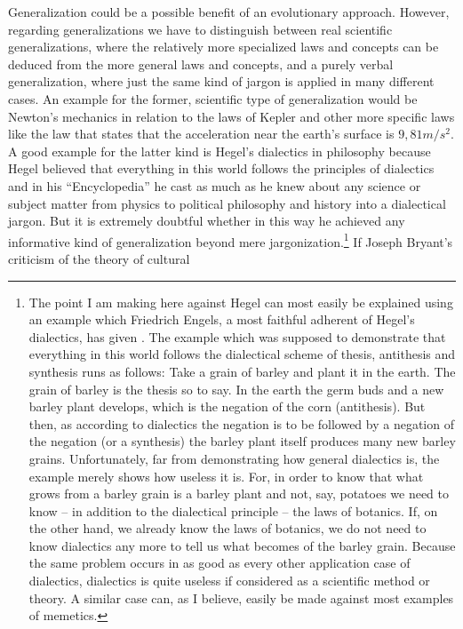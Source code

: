 Generalization could be a possible benefit of an evolutionary
approach.  However, regarding generalizations we have to distinguish
between real scientific generalizations, where the relatively more
specialized laws and concepts can be deduced from the more general
laws and concepts, and a purely verbal generalization, where just the
same kind of jargon is applied in many different cases. An example for
the former, scientific type of generalization would be Newton's
mechanics in relation to the laws of Kepler and other more specific
laws like the law that states that the acceleration near the earth's
surface is $9,81 m/s^2$. A good example for the latter kind is Hegel's
dialectics in philosophy because Hegel believed that everything in
this world follows the principles of dialectics and in his
``Encyclopedia'' he cast as much as he knew about any science or
subject matter from physics to political philosophy and history into a
dialectical jargon. But it is extremely doubtful whether in this way
he achieved any informative kind of generalization beyond mere
jargonization.\footnote{The point I am making here against Hegel can
  most easily be explained using an example which Friedrich Engels, a
  most faithful adherent of Hegel's dialectics, has given
  \cite[p.\ 248]{engels:1878}. The example which was supposed to
  demonstrate that everything in this world follows the dialectical
  scheme of thesis, antithesis and synthesis runs as follows: Take a
  grain of barley and plant it in the earth. The grain of barley is
  the thesis so to say. In the earth the germ buds and a new barley
  plant develops, which is the negation of the corn (antithesis). But
  then, as according to dialectics the negation is to be followed by a
  negation of the negation (or a synthesis) the barley plant itself
  produces many new barley grains. Unfortunately, far from
  demonstrating how general dialectics is, the example merely shows
  how useless it is. For, in order to know that what grows from a
  barley grain is a barley plant and not, say, potatoes we need to
  know -- in addition to the dialectical principle -- the laws of
  botanics.  If, on the other hand, we already know the laws of
  botanics, we do not need to know dialectics any more to tell us what
  becomes of the barley grain.  Because the same problem occurs in as
  good as every other application case of dialectics, dialectics is
  quite useless if considered as a scientific method or theory. A
  similar case can, as I believe, easily be made against most examples
  of memetics.} If Joseph Bryant's criticism of the theory of cultural
